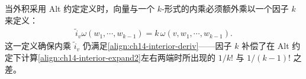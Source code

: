 \documentclass[../../main.tex]{subfiles}
\begin{document}
当外积采用 Alt 约定定义时，向量与一个 $k$-形式的内乘必须额外乘以一个因子 $k$ 来定义：
\begin{align*}
\widetilde{i}_v\omega(w_1,\cdots ,w_{k-1})=k\,\omega(v,w_1,\cdots ,w_{k-1}).
\end{align*}
这一定义确保内乘 $\widetilde{i}_v$ 仍满足\eqref{align:ch14-interior-deriv}——因子 $k$ 补偿了在 Alt 约定下计算\eqref{align:ch14-interior-expand2}左右两端时所出现的 $1/k!$ 与 $1/(k-1)!$ 之差。
\end{document}
